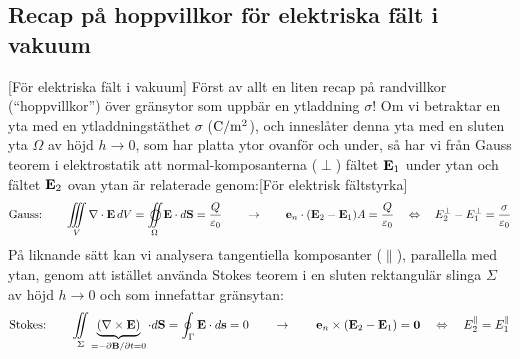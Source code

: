 {\subsection{Recap p{\aa} hoppvillkor f{\"o}r elektriska f{\"a}lt i vakuum}
[F{\"o}r elektriska f{\"a}lt i vakuum]
F{\"o}rst av allt en liten recap p{\aa} randvillkor (``hoppvillkor'') {\"o}ver
gr{\"a}nsytor som uppb{\"a}r en ytladdning $\sigma$!
\noindent
Om vi betraktar en yta med en ytladdningst{\"a}thet
$\sigma$ (${\rm C}/{\rm m}^2$), och innesl{\aa}ter denna yta med en sluten
yta
$\Omega$ av h{\"o}jd $h\to0$, som har platta ytor ovanf{\"o}r och under,
s{\aa} har vi fr{\aa}n Gauss teorem i elektrostatik att normal-komposanterna
($\perp$) f{\"a}ltet ${\bf E}_1$ under ytan och f{\"a}ltet ${\bf E}_2$ ovan
ytan {\"a}r relaterade genom:[F{\"o}r elektrisk f{\"a}ltstyrka]
$$
  \hbox{Gauss:}\qquad
  \displaystyle
  \iiint_V\nabla\cdot{\bf E}\,dV=
  \oiint_{\Omega}{\bf E}\cdot d{\bf S}={{Q}\over{\varepsilon_0}}
  \qquad\to\qquad
  {\bf e}_n \cdot({\bf E}_{2}-{\bf E}_{1})A
    ={{Q}\over{\varepsilon_0}}
  \quad\Leftrightarrow\quad
  E^{\perp}_2-E^{\perp}_1={{\sigma}\over{\varepsilon_0}}
$$
\noindent
P{\aa} liknande s{\"a}tt kan vi analysera tangentiella komposanter
($\parallel$), parallella med ytan, genom att ist{\"a}llet anv{\"a}nda Stokes
teorem i en sluten rektangul{\"a}r slinga $\Sigma$ av h{\"o}jd $h\to0$ och
som innefattar gr{\"a}nsytan:
$$
  \hbox{Stokes:}\qquad
  \iint_{\Sigma}\underbrace{(\nabla\times{\bf E})}_{=-\partial{\bf B}/\partial t=0}
      \cdot d{\bf S}
    =\oint_{\Gamma}{\bf E}\cdot d{\bf s}
    =0
  \qquad\to\qquad
  {\bf e}_n \times({\bf E}_{2}-{\bf E}_{1})={\bf 0}
  \quad\Leftrightarrow\quad
  E^{\parallel}_2=E^{\parallel}_1
$$
\vfill\eject

}
